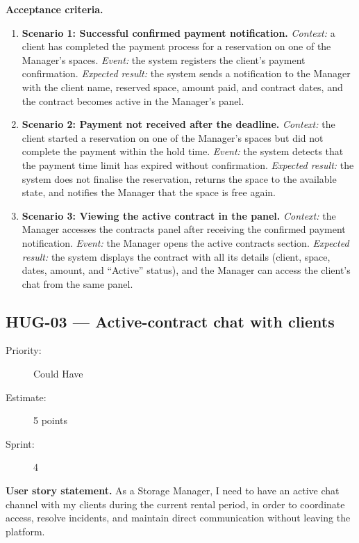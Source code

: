 \documentclass[11pt,a4paper,oneside]{report}
\begin{document}
\textbf{Acceptance criteria.}
\begin{enumerate}
\item \textbf{Scenario 1: Successful confirmed payment notification.} \emph{Context:} a client has completed the payment process for a reservation on one of the Manager's spaces. \emph{Event:} the system registers the client's payment confirmation. \emph{Expected result:} the system sends a notification to the Manager with the client name, reserved space, amount paid, and contract dates, and the contract becomes active in the Manager's panel.
\item \textbf{Scenario 2: Payment not received after the deadline.} \emph{Context:} the client started a reservation on one of the Manager's spaces but did not complete the payment within the hold time. \emph{Event:} the system detects that the payment time limit has expired without confirmation. \emph{Expected result:} the system does not finalise the reservation, returns the space to the available state, and notifies the Manager that the space is free again.
\item \textbf{Scenario 3: Viewing the active contract in the panel.} \emph{Context:} the Manager accesses the contracts panel after receiving the confirmed payment notification. \emph{Event:} the Manager opens the active contracts section. \emph{Expected result:} the system displays the contract with all its details (client, space, dates, amount, and ``Active'' status), and the Manager can access the client's chat from the same panel.
\end{enumerate}

\subsection{HUG-03 --- Active-contract chat with clients}
\label{req:HUG-03}
\begin{description}
\item[Priority:] Could Have \quad \item[Estimate:] 5 points \quad \item[Sprint:] 4
\end{description}

\textbf{User story statement.} As a Storage Manager, I need to have an active chat channel with my clients during the current rental period, in order to coordinate access, resolve incidents, and maintain direct communication without leaving the platform.
\end{document}
